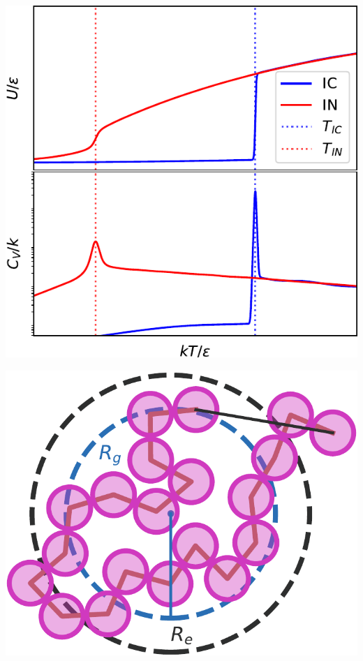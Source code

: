 \documentclass[aspectratio=169]{beamer}
\begin{document}
\begin{frame}[c]{}

  \centering
  \includegraphics[height=\textheight]{../figures/fig-UandCv/fig-UandCv.pdf}

\end{frame}

\begin{frame}[c]{}

  \centering
  \includegraphics[height=\textheight]{../figures/fig-polymer_sizes/fig-polymer_sizes.pdf}

\end{frame}
\end{document}
